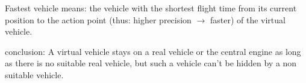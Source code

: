 Fastest vehicle means: the vehicle with the shortest flight time from its current position to the action point (thus: higher precision \begin{math} \rightarrow \end{math} faster)
of the virtual vehicle. 

conclusion:
A virtual vehicle stays on a real vehicle or the central engine as long as there is no suitable real vehicle, but such a vehicle can't 
be hidden by a non suitable vehicle.
